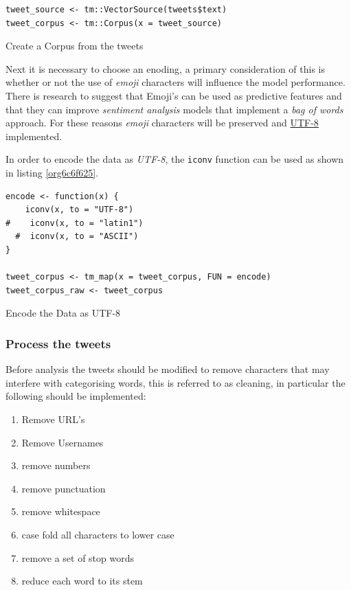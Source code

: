 \documentclass[11pt]{article}
\begin{document}
\begin{listing}[htbp]
\begin{verbatim}
tweet_source <- tm::VectorSource(tweets$text)
tweet_corpus <- tm::Corpus(x = tweet_source)
\end{verbatim}
\caption{\label{org0e91ec4}Create a Corpus from the tweets}
\end{listing}

Next it is necessary to choose an enoding, a primary consideration of this is whether or not the use of \emph{emoji} characters will influence the model performance. There is research to suggest that Emoji's can be used as predictive features \cite{lecompte2017} and that they can improve \emph{sentiment analysis} models \cite{shiha2017} that implement a \emph{bag of words} approach. For these reasons \emph{emoji} characters will be preserved and \href{http://www.utf-8.com/}{UTF-8} implemented.

In order to encode the data as \emph{UTF-8}, the \texttt{iconv} function can be used as shown in listing \ref{org6c6f625}.

\begin{listing}[htbp]
\begin{verbatim}
encode <- function(x) {
    iconv(x, to = "UTF-8")
#    iconv(x, to = "latin1")
  #  iconv(x, to = "ASCII")
}

tweet_corpus <- tm_map(x = tweet_corpus, FUN = encode)
tweet_corpus_raw <- tweet_corpus
\end{verbatim}
\caption{\label{org6c6f625}Encode the Data as UTF-8}
\end{listing}

\subsubsection{Process the tweets}
\label{sec:org1b827fb}
Before analysis the tweets should be modified to remove characters that may interfere with categorising words, this is referred to as cleaning, in particular the following should be implemented:

\begin{enumerate}
\item Remove URL's
\item Remove Usernames
\item remove numbers
\item remove punctuation
\item remove whitespace
\item case fold all characters to lower case
\item remove a set of stop words
\item reduce each word to its stem
\end{enumerate}
\end{document}
